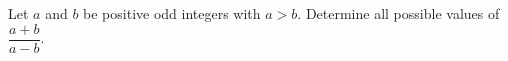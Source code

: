 Let $a$ and $b$ be positive odd integers with $a>b$. Determine all possible values of $\dfrac{a+b}{a-b}$.
